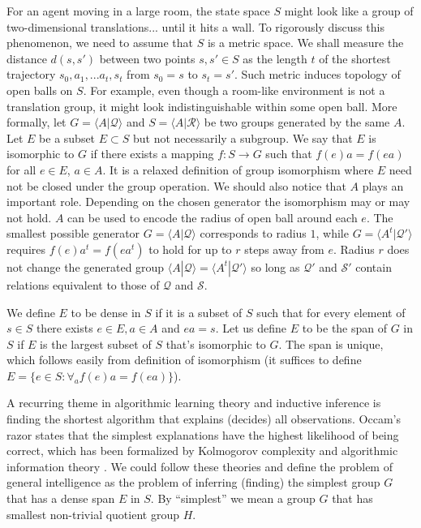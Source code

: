 \documentclass[12pt]{article}
\begin{document}
For an agent moving in a large room, the state space $S$ might look like a group of two-dimensional translations... until it hits a wall. To rigorously discuss this phenomenon, we need to assume that $S$ is a metric space. We shall measure the distance $d(s,s')$ between two points $s,s'\in S$ as the length $t$ of the shortest trajectory $s_0,a_1,...a_{t},s_{t}$ from $s_0=s$ to $s_{t}=s'$. Such metric induces topology of open balls on $S$. For example, even though a room-like environment is not a translation group, it might look indistinguishable within some open ball. More formally, let $G=\langle A|\mathcal{Q} \rangle$ and $S=\langle A|\mathcal{R} \rangle$ be two groups generated by the same $A$. Let $E$ be a subset $E \subset S$ but not necessarily a subgroup. We say that $E$ is isomorphic to $G$ if there exists a mapping $f:S \rightarrow G$ such that $f(e)a=f(ea)$ for all $e\in E$, $a\in A$. It is a relaxed definition of group isomorphism where $E$ need not be closed under the group operation. 
We should also notice that $A$ plays an important role. Depending on the chosen generator the isomorphism may or may not hold. $A$ can be used to encode the radius of open ball around each $e$. The smallest possible generator  $G=\langle A|\mathcal{Q} \rangle$  corresponds to radius $1$, while  $G=\langle A^t|\mathcal{Q}' \rangle$  requires  $f(e)a^t=f(ea^t)$ to hold for up to $r$ steps away from $e$. Radius $r$ does not change the generated group $\langle A|\mathcal{Q} \rangle=\langle A^t|\mathcal{Q}' \rangle$ so long as $\mathcal{Q}'$ and $\mathcal{S}'$ contain  relations equivalent to those of $\mathcal{Q}$ and $\mathcal{S}$. 

We define $E$ to be dense in $S$ if it is a subset of $S$ such that for every element of $s\in S$ there exists $e\in E, a\in A$ and $ea=s$. 
Let us define $E$ to be the span of $G$ in $S$ if $E$ is the largest subset of $S$ that's isomorphic to $G$.  The span is unique, which follows easily from definition of isomorphism (it suffices to define $E =\{e\in S:\forall_a f(e)a=f(ea)\}$).  

A recurring theme in algorithmic learning theory and inductive inference\cite{SOLOMONOFF19641,deLaHiguera} is finding the shortest algorithm that explains (decides) all observations. Occam's razor states that the simplest explanations have the highest likelihood of being correct, which has been formalized by Kolmogorov complexity and algorithmic information theory \cite{Shen2017KolmogorovCA}. We could follow these theories and define the problem of general intelligence as the problem of inferring (finding) the simplest group $G$ that has a dense span $E$ in $S$. By ``simplest'' we mean a group $G$ that has smallest non-trivial quotient group $H$. 
\end{document}
